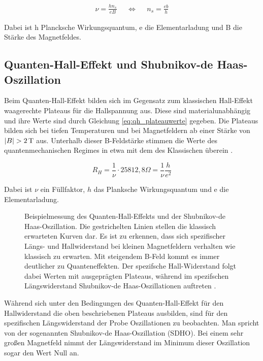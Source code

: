  \begin{align}
 	\nu = \frac{hn_s}{eB} & & \Leftrightarrow & & n_s = \frac{eb}{h}
 	\label{eq:sdh_osz_naeherung}
 \end{align}
 
 Dabei ist h Plancksche Wirkungsquantum, e die Elementarladung und B die Stärke des Magnetfeldes. 
 
 
 

\newpage
\subsection{Quanten-Hall-Effekt und Shubnikov-de Haas-Oszillation}

Beim Quanten-Hall-Effekt bilden sich im Gegensatz zum klassischen Hall-Effekt waagerechte Plateaus für die Hallspannung aus. Diese sind materialunabhängig und ihre Werte sind durch Gleichung \ref{eq:qh_plateauwerte} gegeben. Die Plateaus bilden sich bei tiefen Temperaturen und bei Magnetfeldern ab einer Stärke von $|B| > \unit[2]{T}$ aus. Unterhalb dieser B-Feldstärke stimmen die Werte des quantenmechanischen Regimes in etwa mit dem des Klassischen überein \cite[Kap.3.6]{kopitzki_einfuhrung_2009}.

\begin{equation}
R_H=\frac{1}{\nu}\cdot 25812,8\Omega =\frac{1}{\nu} \frac{h}{e^2}
\label{eq:qh_plateauwerte}
\end{equation}

Dabei ist $\nu$ ein Füllfaktor, $h$ das Planksche Wirkungsquantum und e die Elementarladung. 

\begin{figure}[h]
	\centering
	\caption[Beispiel-Messung Hall-Plateaus und SDH-Oszillation]{Beispielmessung des Quanten-Hall-Effekts und der Shubnikov-de Haas-Oszillation. Die gestrichelten Linien stellen die klassisch erwarteten Kurven dar. Es ist zu erkennen, dass sich spezifischer Längs- und Hallwiderstand bei kleinen Magnetfeldern verhalten wie klassisch zu erwarten. Mit steigendem B-Feld kommt es immer deutlicher zu Quanteneffekten. Der spezifsche Hall-Widerstand folgt dabei Werten mit ausgeprägten Plateaus, während im spezifschen Längswiderstand Shubnikov-de Haas-Oszillationen auftreten \cite{anleitung}.}
	\label{fig:QH_Bsp_Messung_Anleitungsheft}
\end{figure}

Während sich unter den Bedingungen des Quanten-Hall-Effekt für den Hallwiderstand die oben beschriebenen Plateaus ausbilden, sind für den spezifischen Längswiderstand der Probe Oszillationen zu beobachten. Man spricht von der sogenannten Shubnikov-de Haas-Oszillation (SDHO). Bei einem sehr großen Magnetfeld nimmt der Längswiderstand im Minimum dieser Oszillation sogar den Wert Null an.

